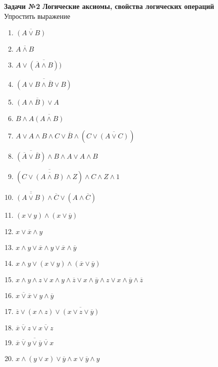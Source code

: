 



    \begin{center}
        \textbf{Задачи №2 Логические аксиомы, свойства логических операций}\\
        Упростить выражение
    \end{center}

    \begin{enumerate}
        \item $\overline{(A \vee B)}$
        \item $\overline{A \wedge B}$
        \item $A \vee \overline{(\overline A \wedge B)})$
        \item $\overline{(A \vee B \wedge \overline B \vee B)}$
        \item $\overline{(A \wedge B) \vee A}$
        \item $B \wedge A \overline{(A \wedge B)}$
        \item $A \vee A \wedge B \wedge C \vee \overline B \wedge (C \vee \overline{(A \vee C)})$
        \item $\overline{(\overline A \vee \overline B)} \wedge B \wedge A \vee A \wedge B$
        \item $\overline{(C \vee \overline{(A \wedge B)} \wedge Z)} \wedge C \wedge Z \wedge 1$
        \item $\overline{\overline{(A \vee B)}} \wedge \overline C \vee (A \wedge \overline C)$
        \item $(x \vee y) \wedge (x \vee \overline y)$
        \item $x \vee \overline x \wedge y$
        \item $x \wedge y \vee \overline x \wedge y \vee \overline x \wedge \overline y$
        \item $x \wedge y \vee (x \vee y) \wedge (\overline x \vee \overline y)$
        \item $x \wedge y \wedge z \vee x \wedge y \wedge \overline z \vee x \wedge \overline y \wedge z \vee x \wedge \overline y \wedge \overline z$
        \item $\overline{x \vee \overline x} \vee y \wedge \overline y$
        \item $\overline z \vee (x \wedge z) \vee \overline{(x \vee z \vee \overline y)}$
        \item $\overline{\overline x \vee z} \vee \overline{x \vee z}$
        \item $\overline{\overline{\overline x \vee y} \vee \overline{\overline y \vee x}}$
        \item $x \wedge (y \vee x) \vee \overline y \wedge x \vee \overline y \wedge y$
    \end{enumerate}


